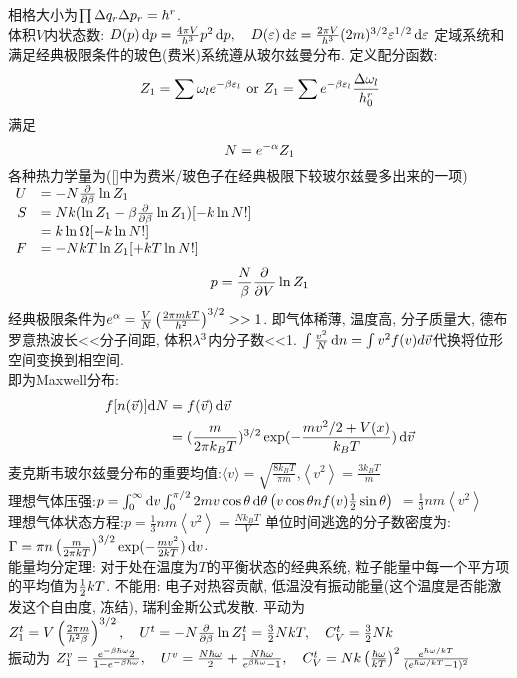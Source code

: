 \documentclass[UTF8,8pt]{ctexart}
\newcommand{\q}[1]{{\color{red} #1}}
\begin{document}
\begin{multicols}{3}
相格大小为$\prod \Delta q_r\Delta p_r=h^r$.\\
体积$V$内状态数:
$D(p)\mathop{}\!\mathrm{d} p=\frac{4\pi V}{h^3}p^2 \mathop{}\!\mathrm{d} p, \quad D(\varepsilon)\mathop{}\!\mathrm{d}\varepsilon = \frac{2\pi V}{h^3}(2m)^{3/2}\varepsilon^{1/2}\mathop{}\!\mathrm{d}\varepsilon$
定域系统和满足经典极限条件的玻色(费米)系统遵从玻尔兹曼分布. 
定义配分函数:
$$Z_1=\sum \omega_le^{-\beta\varepsilon_l}\text{  or  }Z_1=\sum e^{-\beta\varepsilon_l}\frac{\Delta \omega_l}{h_0^r}$$
满足$$N=e^{-\alpha}Z_1$$
各种热力学量为([]中为费米/玻色子在经典极限下较玻尔兹曼多出来的一项)
$\begin{array}{rl}
		U &= -N \frac{\partial^{} }{\partial {\beta}^{}}\ln Z_1                      \\
		S &= Nk(\ln Z_1-\beta\frac{\partial^{} }{\partial {\beta}^{}}\ln Z_1)[-k\ln N!] \\
		&= k\ln\Omega[-k\ln N!]                           \\
		F &= -NkT\ln Z_1[+kT\ln N!]           
	\end{array}$
	$$p=\frac{N}{\beta}\frac{\partial^{} }{\partial {V}^{}}\ln Z_1$$
	经典极限条件为$e^\alpha = \frac{V}{N}\left( \frac{2\pi mkT}{h^2} \right)^{3/2}>>1$. 即气体稀薄, 温度高, 分子质量大, 德布罗意热波长<<分子间距, 体积$\lambda^3$内分子数<<1.
$\int \frac{v^2}{N}\mathop{}\!\mathrm{d} n=\int v^2f(v)d\vec{v}$代换将位形空间变换到相空间. \\
即为Maxwell分布:
$$\begin{aligned} f[ n(\vec{v})]{\mathop{}\!\mathrm{d}N}&= f(\vec{v})\mathop{}\!\mathrm{d} \vec v \\
		&=(\frac{m}{2\pi k_BT})^{3/2}\exp (-\frac{mv^2/2+V(x)}{k_BT})\mathop{}\!\mathrm{d} \vec v \end{aligned}$$
麦克斯韦玻尔兹曼分布的重要均值:$\langle v\rangle=\sqrt{\frac{8 k_{B} T}{\pi m}}$,$\left\langle v^{2}\right\rangle=\frac{3 k_{B} T}{m}$\\
理想气体压强:$p=\int_{0}^{\infty} \mathop{}\!\mathrm{d} v \int_{0}^{\pi / 2} 2 m v \cos \theta \mathop{}\!\mathrm{d} \theta\left(v \cos \theta n f(v) \frac{1}{2} \sin \theta\right)$
$=\frac{1}{3} n m\left\langle v^{2}\right\rangle$\\
理想气体状态方程:$p=\frac{1}{3} n m\left\langle v^{2}\right\rangle=\frac{N k_{B} T}{V}$
单位时间逃逸的分子数密度为: $\Gamma = \pi  n \left( \frac{m}{2\pi kT} \right)^{3/2} \exp(-\frac{mv^2}{2kT}) \mathop{}\!\mathrm{d} v$. \\
\q{能量均分定理}: 对于处在温度为$T$的平衡状态的经典系统, 粒子能量中每一个平方项的平均值为$\frac{1}{2}kT$. 不能用: 电子对热容贡献, 低温没有振动能量(这个温度是否能激发这个自由度, 冻结), 瑞利金斯公式发散. 
平动为
$Z_1^t=V\left( \frac{2\pi m}{h^2\beta} \right)^{3/2},\quad U^t=-N\frac{\partial^{} }{\partial {\beta}^{}}\ln Z_1^t=\frac{3}{2}NkT,\quad C_V^t=\frac{3}{2}Nk$\\
振动为
$Z_1^v=\frac{e^{-\beta\hbar\omega}{2}}{1-e^{-\beta\hbar\omega}},\quad U^v=\frac{N\hbar\omega}{2}+\frac{N\hbar\omega}{e^{\beta\hbar\omega}-1},\quad C_V^t=Nk\left( \frac{\hbar\omega}{kT} \right)^2\frac{e^{\hbar\omega/kT}}{(e^{\hbar\omega/kT}-1)^2}$\\

\end{multicols}
\end{document}
